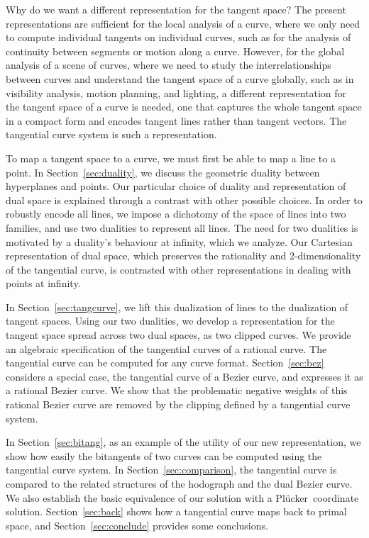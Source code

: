 \documentclass[12pt]{article}
\newcommand{\plucker}{Pl\"{u}cker\ }
\begin{document}
Why do we want a different representation for the tangent space?
The present representations 
are sufficient for the local analysis of a curve,
where we only need to compute individual tangents on individual curves,
such as for the analysis of continuity between segments or motion along a curve.
However, for the global analysis of a scene of curves,
where we need to study the interrelationships between curves and understand the
tangent space of a curve globally,
such as in visibility analysis, motion planning, and lighting,
a different representation for the tangent space of a curve is needed,
one that captures the whole tangent space in a compact form 
and encodes tangent lines rather than tangent vectors.
The tangential curve system is such a representation.

To map a tangent space to a curve, we must first be able to map a line to a point.
In Section~\ref{sec:duality}, we discuss the geometric duality between hyperplanes and points.
Our particular choice of duality and representation of dual space is explained through
a contrast with other possible choices.
In order to robustly encode all lines, we impose a dichotomy of the space of lines into two families,
and use two dualities to represent all lines.
The need for two dualities is motivated by a duality's behaviour at infinity,
which we analyze.
Our Cartesian representation of dual space, which preserves the rationality 
and 2-dimensionality of the tangential curve, 
is contrasted with other representations in dealing with points at infinity.

In Section~\ref{sec:tangcurve}, we lift this dualization of lines to the dualization of tangent spaces.
Using our two dualities, we develop a representation
for the tangent space spread across two dual spaces, as two clipped curves.
We provide an algebraic specification of the tangential curves of a rational curve.
The tangential curve can be computed for any curve format.
Section~\ref{sec:bez} considers a special case, the tangential curve of a Bezier curve,
and expresses it as a rational Bezier curve.
We show that the problematic negative weights of this rational Bezier curve
are removed by the clipping defined by a tangential curve system.

In Section~\ref{sec:bitang},
as an example of the utility of our new representation, 
we show how easily the bitangents of two curves can be computed
using the tangential curve system.
In Section~\ref{sec:comparison}, the tangential curve is compared to 
the related structures of the hodograph and the dual Bezier curve.
We also establish the basic equivalence
of our solution with a \plucker coordinate solution.
Section~\ref{sec:back} shows how a tangential curve maps back to primal space,
and Section~\ref{sec:conclude} provides some conclusions.
\end{document}
